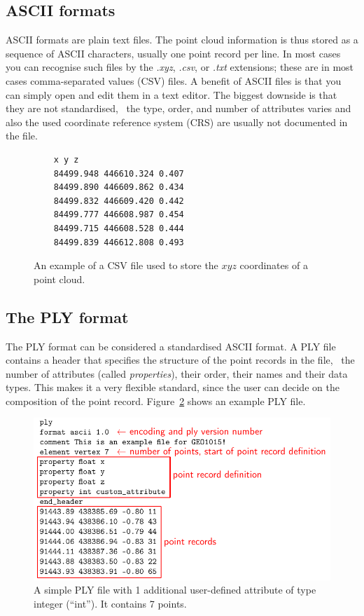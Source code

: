 \subsection{ASCII formats}
ASCII formats are plain text files. 
The point cloud information is thus stored as a sequence of ASCII characters, usually one point record per line.
In most cases you can recognise such files by the \emph{.xyz}, \emph{.csv}, or \emph{.txt} extensions; these are in most cases comma-separated values (CSV) files.
A benefit of ASCII files is that you can simply open and edit them in a text editor.
The biggest downside is that they are not standardised, \ie\ the type, order, and number of attributes varies and also the used coordinate reference system (CRS) are usually not documented in the file.
\begin{figure}[h]
  \begin{lstlisting}
    x y z
    84499.948 446610.324 0.407
    84499.890 446609.862 0.434
    84499.832 446609.420 0.442
    84499.777 446608.987 0.454
    84499.715 446608.528 0.444
    84499.839 446612.808 0.493
  \end{lstlisting}
  \caption{An example of a CSV file used to store the $xyz$ coordinates of a point cloud.}%
\label{fig:csv}
\end{figure}


\subsection{The PLY format}%
The PLY format can be considered a standardised ASCII format.
A PLY file contains a header that specifies the structure of the point records in the file, \ie\ the number of attributes (called \emph{properties}), their order, their names and their data types.
This makes it a very flexible standard, since the user can decide on the composition of the point record.
Figure~\ref{fig:ply} shows an example PLY file.
\begin{figure}
  \includegraphics[width=\linewidth]{figs/ply_header.pdf}
  \caption{A simple PLY file with 1 additional user-defined attribute of type integer (``int''). It contains 7 points.}%
\label{fig:ply}
\end{figure}

